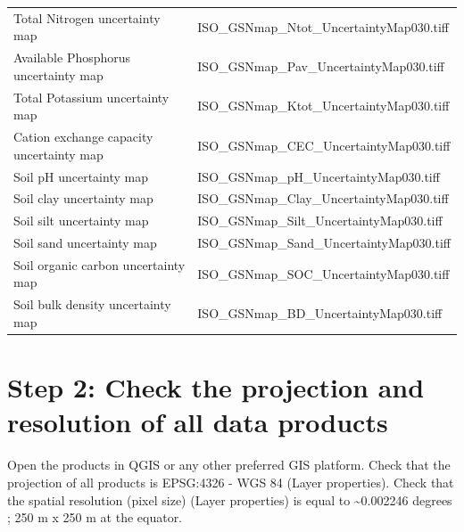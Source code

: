 \documentclass[
  10pt,
  b5paper,
  oneside]{book}
\begin{document}
\begin{table}
\begin{tabular}[t]{ll}
\hspace{1em}Total Nitrogen uncertainty map & ISO\_GSNmap\_Ntot\_UncertaintyMap030.tiff\\
\hspace{1em}Available Phosphorus uncertainty map & ISO\_GSNmap\_Pav\_UncertaintyMap030.tiff\\
\hspace{1em}Total Potassium uncertainty map & ISO\_GSNmap\_Ktot\_UncertaintyMap030.tiff\\
\hspace{1em}Cation exchange capacity uncertainty map & ISO\_GSNmap\_CEC\_UncertaintyMap030.tiff\\
\hspace{1em}Soil pH uncertainty map & ISO\_GSNmap\_pH\_UncertaintyMap030.tiff\\
\hspace{1em}Soil clay uncertainty map & ISO\_GSNmap\_Clay\_UncertaintyMap030.tiff\\
\hspace{1em}Soil silt uncertainty map & ISO\_GSNmap\_Silt\_UncertaintyMap030.tiff\\
\hspace{1em}Soil sand uncertainty map & ISO\_GSNmap\_Sand\_UncertaintyMap030.tiff\\
\hspace{1em}Soil organic carbon uncertainty map & ISO\_GSNmap\_SOC\_UncertaintyMap030.tiff\\
\hspace{1em}Soil bulk density uncertainty map & ISO\_GSNmap\_BD\_UncertaintyMap030.tiff\\
\bottomrule
\end{tabular}
\end{table}

\hypertarget{step-2-check-the-projection-and-resolution-of-all-data-products}{%
\section*{Step 2: Check the projection and resolution of all data products}\label{step-2-check-the-projection-and-resolution-of-all-data-products}}

Open the products in QGIS or any other preferred GIS platform. Check that the projection of all products is EPSG:4326 - WGS 84 (Layer properties). Check that the spatial resolution (pixel size) (Layer properties) is equal to \textasciitilde0.002246 degrees ; 250 m x 250 m at the equator.
\end{document}

